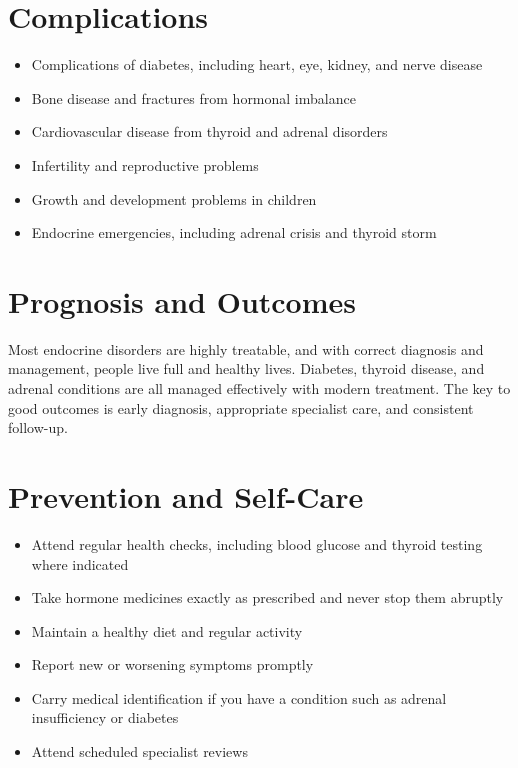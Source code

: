 \section*{Complications}
\begin{itemize}
    \item Complications of diabetes, including heart, eye, kidney, and nerve disease
    \item Bone disease and fractures from hormonal imbalance
    \item Cardiovascular disease from thyroid and adrenal disorders
    \item Infertility and reproductive problems
    \item Growth and development problems in children
    \item Endocrine emergencies, including adrenal crisis and thyroid storm
\end{itemize}

\section*{Prognosis and Outcomes}
Most endocrine disorders are highly treatable, and with correct diagnosis and management, people live full and healthy lives. Diabetes, thyroid disease, and adrenal conditions are all managed effectively with modern treatment. The key to good outcomes is early diagnosis, appropriate specialist care, and consistent follow-up.

\section*{Prevention and Self-Care}
\begin{itemize}
    \item Attend regular health checks, including blood glucose and thyroid testing where indicated
    \item Take hormone medicines exactly as prescribed and never stop them abruptly
    \item Maintain a healthy diet and regular activity
    \item Report new or worsening symptoms promptly
    \item Carry medical identification if you have a condition such as adrenal insufficiency or diabetes
    \item Attend scheduled specialist reviews
\end{itemize}

